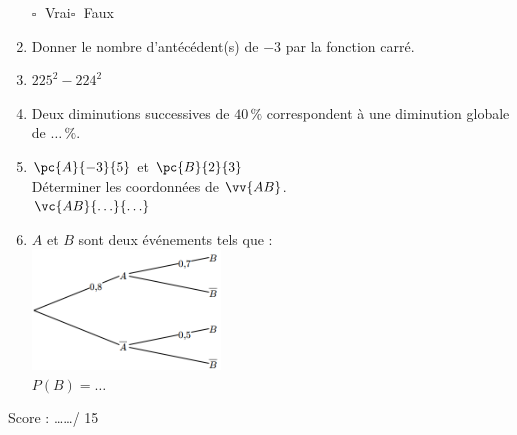 \documentclass[a4paper,11pt,landscape,exos]{nsi} %
\begin{document}
\begin{multicols}{2}
\begin{enumerate}[]
    	$\square\;$ Vrai\qquad $\square\;$ Faux\qquad 
	\item Donner le nombre d'antécédent(s) de $-3$ par la fonction carré. 
	\item $225^2-224^2$ 
	\item Deux diminutions successives de  $40\,\%$ correspondent à une diminution globale de  $\ldots \,\%$.
	\item $\pc{A}{-3}{5}$ et $\pc{B}{2}{3}$\\
         Déterminer les coordonnées de $\vv{AB}$.\\[.5em]$\vc{AB}{\ldots}{\ldots}$
	\item $A$ et $B$ sont deux événements tels que :\\
	\includegraphics[width=5cm]{CAN6arbre.png}\\
$P(B)=\ldots$ 
\end{enumerate}

\vfill\null

Score : \ldots\ldots / 15
\end{multicols}

\newpage
\end{document}

